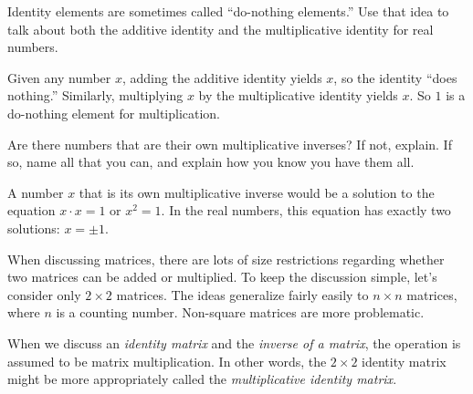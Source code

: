 \documentclass[space,handout,nooutcomes]{ximera}
\begin{document}
\begin{question}Identity elements are sometimes called ``do-nothing elements.''  Use that idea to talk about both the additive identity and the multiplicative identity for real numbers.  
\begin{freeResponse}
\begin{hint}
Given any number $x$, adding the additive identity yields $x$, so the identity ``does nothing.''  Similarly, multiplying $x$ by the multiplicative identity yields $x$.  So $1$ is a do-nothing element for multiplication.  
\end{hint}
\end{freeResponse}
\end{question}

\begin{question}
Are there numbers that are their own multiplicative inverses?  If not, explain.  If so, name all that you can, and explain how you know you have them all.
\begin{freeResponse}
\begin{hint}
A number $x$ that is its own multiplicative inverse would be a solution to the equation $x\cdot x=1$ or $x^2=1$.  In the real numbers, this equation has exactly two solutions:  $x = \pm 1$.  
\end{hint}
\end{freeResponse}
\end{question}

When discussing matrices, there are lots of size restrictions
regarding whether two matrices can be added or multiplied.  To keep
the discussion simple, let's consider only $2\times 2$ matrices.  The
ideas generalize fairly easily to $n\times n$ matrices, where $n$ is a
counting number.  Non-square matrices are more problematic.

When we discuss an \emph{identity matrix} and the \emph{inverse of a
  matrix}, the operation is assumed to be matrix multiplication.  In
other words, the $2\times 2$ identity matrix might be more
appropriately called the \emph{multiplicative identity matrix}.
\end{document}
